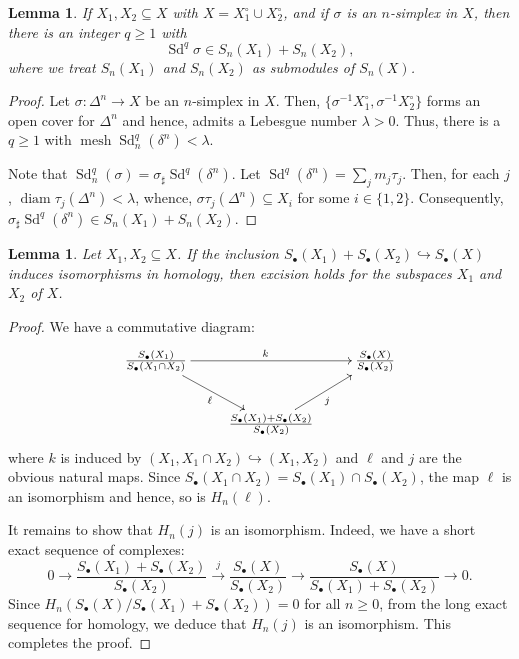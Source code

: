 \documentclass[10pt]{article}
\theoremstyle{thmstyle}
\newtheorem{lemma}[theorem]{Lemma}
\theoremstyle{defstyle}
\newcommand{\into}{\hookrightarrow}
\renewcommand{\ge}{\geqslant}
\newcommand{\Sd}{\operatorname{Sd}}
\newcommand{\mesh}{\operatorname{mesh}}
\newcommand{\diam}{\operatorname{diam}}
\begin{document}
\begin{lemma}
    If $X_1, X_2\subseteq X$ with $X = X_1^\circ\cup X_2^\circ$, and if $\sigma$ is an $n$-simplex in $X$, then there is an integer $q\ge 1$ with 
    \begin{equation*}
        \Sd^q\sigma\in S_n(X_1) + S_n(X_2),
    \end{equation*}
    where we treat $S_n(X_1)$ and $S_n(X_2)$ as submodules of $S_n(X)$.
\end{lemma}
\begin{proof}
    Let $\sigma:\Delta^n\to X$ be an $n$-simplex in $X$. Then, $\{\sigma^{-1}X_1^\circ, \sigma^{-1}X_2^\circ\}$ forms an open cover for $\Delta^n$ and hence, admits a Lebesgue number $\lambda > 0$. Thus, there is a $q\ge 1$ with $\mesh\Sd^q_n(\delta^n) < \lambda$.

    Note that $\Sd_n^q(\sigma) = \sigma_\sharp\Sd^q(\delta^n)$. Let $\Sd^q(\delta^n) = \sum_{j} m_j\tau_j$. Then, for each $j$, $\diam\tau_j(\Delta^n) < \lambda$, whence, $\sigma\tau_j(\Delta^n)\subseteq X_i$ for some $i\in\{1,2\}$. Consequently, $\sigma_\sharp\Sd^q(\delta^n)\in S_n(X_1) + S_n(X_2)$.
\end{proof}

\begin{lemma}
    Let $X_1, X_2\subseteq X$. If the inclusion $S_\bullet(X_1) + S_\bullet(X_2)\into S_\bullet(X)$ induces isomorphisms in homology, then excision holds for the subspaces $X_1$ and $X_2$ of $X$.
\end{lemma}
\begin{proof}
    We have a commutative diagram: 
    \begin{equation*}
        \xymatrix {
            \frac{S_\bullet(X_1)}{S_\bullet(X_1\cap X_2)}\ar[rr]^k\ar[rd]_\ell & & \frac{S_\bullet(X)}{S_\bullet(X_2)}\\
            & \frac{S_\bullet(X_1) + S_\bullet(X_2)}{S_\bullet(X_2)}\ar[ru]_j & 
        }
    \end{equation*}
    where $k$ is induced by $(X_1, X_1\cap X_2)\into(X_1, X_2)$ and $\ell$ and $j$ are the obvious natural maps. Since $S_\bullet(X_1\cap X_2) = S_\bullet(X_1)\cap S_\bullet(X_2)$, the map $\ell$ is an isomorphism and hence, so is $H_n(\ell)$.

    It remains to show that $H_n(j)$ is an isomorphism. Indeed, we have a short exact sequence of complexes: 
    \begin{equation*}
        0\longrightarrow\frac{S_\bullet(X_1) + S_\bullet(X_2)}{S_\bullet(X_2)}\stackrel{j}{\longrightarrow}\frac{S_\bullet(X)}{S_\bullet(X_2)}\longrightarrow\frac{S_\bullet(X)}{S_\bullet(X_1) + S_\bullet(X_2)}\longrightarrow 0.
    \end{equation*}
    Since $H_n(S_\bullet(X)/S_\bullet(X_1) + S_\bullet(X_2)) = 0$ for all $n\ge 0$, from the long exact sequence for homology, we deduce that $H_n(j)$ is an isomorphism. This completes the proof.
\end{proof}
\end{document}
